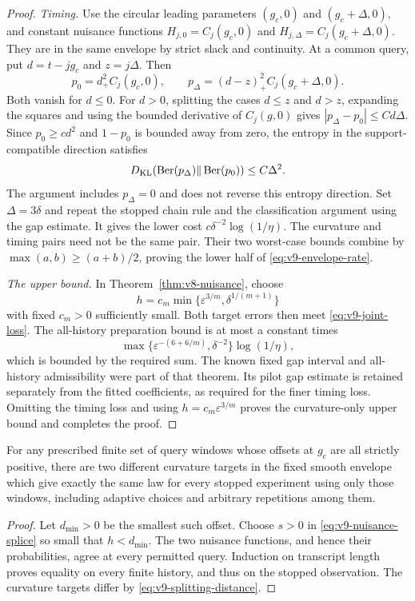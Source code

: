 \begin{proof}
\emph{Timing.}
Use the circular leading parameters $(g_c,0)$ and
$(g_c+\Delta,0)$, and constant nuisance functions
$H_{j,0}=C_j(g_c,0)$ and
$H_{j,\Delta}=C_j(g_c+\Delta,0)$.
They are in the same envelope by strict slack and continuity.
At a common query, put $d=t-jg_c$ and $z=j\Delta$. Then
\[
 p_0=d_+^2C_j(g_c,0),\qquad
 p_\Delta=(d-z)_+^2C_j(g_c+\Delta,0).
\]
Both vanish for $d\le0$. For $d>0$, splitting the cases $d\le z$
and $d>z$, expanding the squares and using the bounded derivative of
$C_j(g,0)$ gives $|p_\Delta-p_0|\le C d\Delta$.
Since $p_0\ge cd^2$ and $1-p_0$ is bounded away from zero, the
entropy in the support-compatible direction satisfies
\[
 D_{\rm KL}(\operatorname{Ber}(p_\Delta)
                  \Vert\operatorname{Ber}(p_0))\le C\Delta^2.
\]
The argument includes $p_\Delta=0$ and does not reverse this
entropy direction. Set $\Delta=3\delta$ and repeat the stopped
chain rule and the classification argument using the gap estimate.
It gives the lower cost $c\delta^{-2}\log(1/\eta)$.
The curvature and timing pairs need not be the same pair. Their two
worst-case bounds combine by $\max(a,b)\ge(a+b)/2$, proving the
lower half of \eqref{eq:v9-envelope-rate}.

\emph{The upper bound.}
In Theorem~\ref{thm:v8-nuisance}, choose
\[
 h=c_m\min\{\varepsilon^{3/m},\delta^{1/(m+1)}\}
\]
with fixed $c_m>0$ sufficiently small. Both target errors then meet
\eqref{eq:v9-joint-loss}. The all-history preparation bound is at
most a constant times
\[
 \max\{\varepsilon^{-(6+6/m)},\delta^{-2}\}\log(1/\eta),
\]
which is bounded by the required sum. The known fixed gap interval
and all-history admissibility were part of that theorem. Its pilot
gap estimate is retained separately from the fitted coefficients,
as required for the finer timing loss. Omitting the timing loss and
using $h=c_m\varepsilon^{3/m}$ proves the curvature-only upper
bound and completes the proof.
\end{proof}

\begin{corollary}
\label{cor:v9-fixed-window-envelope}
For any prescribed finite set of query windows whose offsets at
$g_c$ are all strictly positive, there are two different curvature
targets in the fixed smooth envelope which give exactly the same law
for every stopped experiment using only those windows, including
adaptive choices and arbitrary repetitions among them.
\end{corollary}
\begin{proof}
Let $d_{\min}>0$ be the smallest such offset. Choose $s>0$ in
\eqref{eq:v9-nuisance-splice} so small that $h<d_{\min}$.
The two nuisance functions, and hence their probabilities, agree at
every permitted query. Induction on transcript length proves equality
on every finite history, and thus on the stopped observation. The
curvature targets differ by \eqref{eq:v9-splitting-distance}.
\end{proof}

